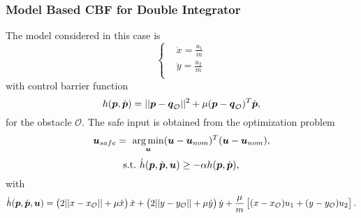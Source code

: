 \subsubsection*{Model Based CBF for Double Integrator}
The model considered in this case is
\begin{equation*}
\left\{ \begin{aligned}
    &\ddot{x}      = \frac{u_1}{m} \\
    &\ddot{y}      = \frac{u_2}{m} \\
\end{aligned} \right.
\end{equation*}
with control barrier function
\begin{equation*}
    h(\boldsymbol{p},\dot{\boldsymbol{p}})=||\boldsymbol{p}-{\boldsymbol{q}}_\mathcal{O}||^2+\mu(\boldsymbol{p}-{\boldsymbol{q}}_\mathcal{O})^T\dot{\boldsymbol{p}},
\end{equation*}
for the obstacle $\mathcal{O}$. The safe input is obtained from the optimization problem
\begin{equation*}
    \boldsymbol{u}_{safe}=~\underset{\boldsymbol{u}}{\arg\min}(\boldsymbol{u}-\boldsymbol{u}_{nom})^T(\boldsymbol{u}-\boldsymbol{u}_{nom}),
\end{equation*}
\begin{equation*}
    \mathrm{s.t.}\,\, \dot{h}(\boldsymbol{p},\dot{\boldsymbol{p}},\boldsymbol{u})\geq -\alpha h(\boldsymbol{p},\dot{\boldsymbol{p}}),
\end{equation*}
with
\begin{equation*}
    \dot{h}(\boldsymbol{p},\dot{\boldsymbol{p}},\boldsymbol{u}) = \left( 2 ||x-x_\mathcal{O}|| + \mu \dot{x}\right)\dot{x} + \left( 2 ||y-y_\mathcal{O}|| + \mu \dot{y}\right)\dot{y} + \frac{\mu}{m} \left[ (x-x_\mathcal{O})u_1 + (y-y_\mathcal{O}) u_2 \right].
\end{equation*}

